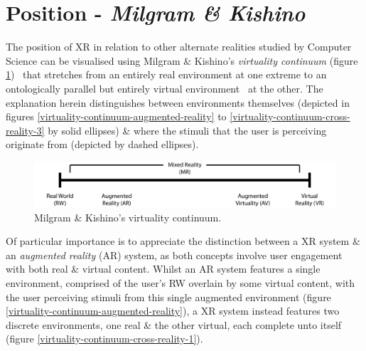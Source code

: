 \documentclass[oneside]{book}
\begin{document}

\section{Position - \textit{Milgram \& Kishino}}
The position of XR in relation to other alternate realities studied by Computer Science can be visualised using Milgram \& Kishino's \textit{virtuality continuum} (figure \ref{virtuality-continuum-original})~\cite{Milgram1994} that stretches from an entirely real environment at one extreme to an ontologically parallel but entirely virtual environment~\cite{Qvortrup2002} at the other. The explanation herein distinguishes between environments themselves (depicted in figures \ref{virtuality-continuum-augmented-reality} to \ref{virtuality-continuum-cross-reality-3} by solid ellipses) \& where the stimuli that the user is perceiving originate from (depicted by dashed ellipses).


\begin{figure}[h]
	\begin{center}
		\includegraphics[width=\textwidth]{images/virtuality-continuum-original.png}
		\caption{Milgram \& Kishino's virtuality continuum.}
		\label{virtuality-continuum-original}
	\end{center}
\end{figure}

Of particular importance is to appreciate the distinction between a XR system \& an \textit{augmented reality} (AR) system, as both concepts involve user engagement with both real \& virtual content. Whilst an AR system features a single environment, comprised of the user's RW overlain by some virtual content, with the user perceiving stimuli from this single augmented environment (figure \ref{virtuality-continuum-augmented-reality}), a XR system instead features two discrete environments, one real \& the other virtual, each complete unto itself (figure \ref{virtuality-continuum-cross-reality-1}).
\end{document}
